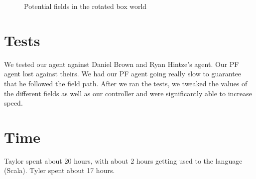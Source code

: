 \documentclass[11pt]{article}
\begin{document}
\begin{figure}[h]
	\caption{Potential fields in the rotated box world}
\end{figure}

\section{Tests}
We tested our agent against Daniel Brown and Ryan Hintze's agent.
Our PF agent lost against theirs.
We had our PF agent going really slow to guarantee that he followed the field path.
After we ran the tests, we tweaked the values of the different fields as well as our controller and were significantly able to increase speed.

\section{Time}
Taylor spent about 20 hours, with about 2 hours getting used to the language (Scala).
Tyler spent about 17 hours.
\end{document}
